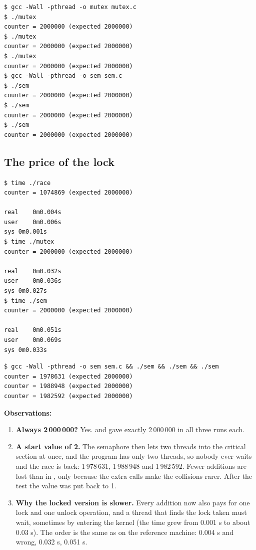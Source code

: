 \documentclass[11pt,a4paper]{article}
\begin{document}
\begin{lstlisting}[caption={mutex and sem, three runs each}]
$ gcc -Wall -pthread -o mutex mutex.c
$ ./mutex
counter = 2000000 (expected 2000000)
$ ./mutex
counter = 2000000 (expected 2000000)
$ ./mutex
counter = 2000000 (expected 2000000)
$ gcc -Wall -pthread -o sem sem.c
$ ./sem
counter = 2000000 (expected 2000000)
$ ./sem
counter = 2000000 (expected 2000000)
$ ./sem
counter = 2000000 (expected 2000000)
\end{lstlisting}

\subsection{The price of the lock}

\begin{lstlisting}[caption={Timing the three versions}]
$ time ./race
counter = 1074869 (expected 2000000)

real	0m0.004s
user	0m0.006s
sys	0m0.001s
$ time ./mutex
counter = 2000000 (expected 2000000)

real	0m0.032s
user	0m0.036s
sys	0m0.027s
$ time ./sem
counter = 2000000 (expected 2000000)

real	0m0.051s
user	0m0.069s
sys	0m0.033s
\end{lstlisting}

\begin{lstlisting}[caption={sem.c with sem\_init(\&s, 0, 2), three runs}]
$ gcc -Wall -pthread -o sem sem.c && ./sem && ./sem && ./sem
counter = 1978631 (expected 2000000)
counter = 1988948 (expected 2000000)
counter = 1982592 (expected 2000000)
\end{lstlisting}

\textbf{Observations:}
\begin{enumerate}
  \item \textbf{Always 2\,000\,000?} Yes.  and  gave exactly 2\,000\,000
  in all three runs each.
  \item \textbf{A start value of 2.} The semaphore then lets two threads into the critical
  section at once, and the program has only two threads, so nobody ever waits and the race is
  back: 1\,978\,631, 1\,988\,948 and 1\,982\,592. Fewer additions are lost than in
  , only because the extra calls make the collisions rarer. After the test the value
  was put back to 1.
  \item \textbf{Why the locked version is slower.} Every addition now also pays for one lock
  and one unlock operation, and a thread that finds the lock taken must wait, sometimes by
  entering the kernel (the  time grew from 0.001 s to about 0.03 s). The order is the
  same as on the reference machine:  0.004 s and wrong,  0.032 s,
   0.051 s.
\end{enumerate}
\end{document}
